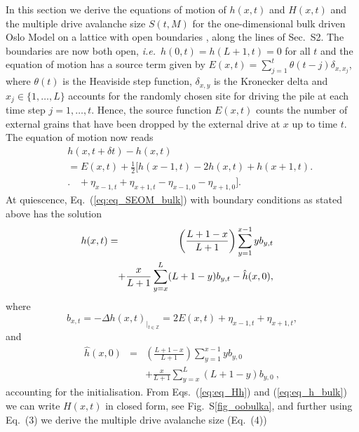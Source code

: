 \documentclass[doublecol]{epl2}
\newcommand{\latin}[1]{{\it #1}}
\newcommand{\elabel}[1]{\label{eq:#1}}
\newcommand{\eref}[1]{(\ref{eq:#1})}
\newcommand{\Eref}[1]{Eq.~(\ref{eq:#1})}
\newcommand{\Esref}[1]{Eqs.~(\ref{eq:#1})}
\newcommand{\bungledXR}[2]{#2}
\begin{document}
 In this section we derive the equations of motion of $h(x,t)$ and $H(x,t)$
 and the multiple drive avalanche size $S(t,M)$ for the one-dimensional bulk driven Oslo Model on a lattice with open boundaries \cite{PhysRevE.78.041102, pruessner2012self}, along the lines of Sec.~S2.%
 The boundaries are now both open, \latin{i.e.}~$h(0,t)=h(L+1,t)=0$ for all $t$ and the equation
 of motion has a source term given by $E(x,t) = \sum_{j=1}^t\theta
 (t-j)\delta_{x,x_j}$, where $\theta(t)$ is the Heaviside step function, $\delta_
 {x,y}$ is the Kronecker delta and $x_j\in\{1,\ldots,L\}$ accounts for the
 randomly chosen site for driving the pile at each time step $j=1,\ldots,t$.
 Hence, the source function $E(x,t)$ counts the number of external grains
 that have been dropped by the external drive at $x$ up to time $t$. The equation
 of motion now reads
\begin{eqnarray}
&&{h}({x,t+\delta t})-{h}({x,t})  \nonumber\\
&&=E(x,t)+\frac{1}{2}\big[{h}({x-1,t}) - 2{h}({x,t}) +{h}({x+1,t})\big.\nonumber\\
&& \big.\hspace{10pt}+ \eta_{x-1,t} + \eta_{x+1,t}-\eta_{x-1,0} - \eta_{x+1,0}\big]. \elabel{eq_SEOM_bulk}
\end{eqnarray}
At quiescence, \Eref{eq_SEOM_bulk} with boundary conditions as stated above has the solution
\begin{eqnarray}
\hspace{-10pt}h(x,t)  &=& \left(\frac{L+1-x}{L+1}\right)\sum_{y=1}^{x-1}yb_{y,t}\nonumber\\
&&\hspace{-10pt}+\frac{x}{L+1}\sum_
{y=x}^L(L+1-y)b_{y,t}-\hat{h}(x,0), \elabel{eq_h_bulk}
\end{eqnarray}
where 
\begin{equation}
b_{x,t}=-\Delta h(x,t)_{|_{t\in\mathbb{Z}}}=2E(x,t)+\eta_{x-1,t}+\eta_{x+1,t},
\end{equation}
and
\begin{eqnarray}
\hat{h}(x,0)&=&\left(\frac{L+1-x}{L+1}\right)\sum_{y=1}^{x-1}yb_{y,0}\nonumber\\
&&+\frac{x}{L+1}\sum_{y=x}^L(L+1-y)b_{y,0}\ ,
\end{eqnarray}
accounting for the initialisation.
From \Esref{eq_Hh} and \eref{eq_h_bulk} we can write $H(x,t)$ in closed form, see Fig.~S\ref{fig_oobulka}, and further using \bungledXR{\Eref{eq_def_S}}{Eq.~(3)} we derive the multiple drive avalanche size (\cf \bungledXR{}{Eq.~(4)})
\end{document}
